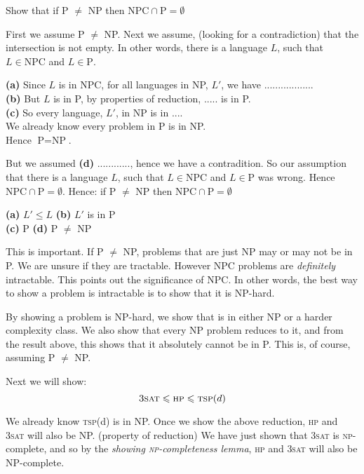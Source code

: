 \begin{example}
Show that if P $\neq$ NP then $\text{NPC} \cap \text{P} = \emptyset$

First we assume P $\neq$ NP. Next we assume, (looking for a contradiction) 
that the intersection is not empty. In other words,
there is a language $L$, such that $L \in \text{NPC}$ and $L \in \text{P}$.

\textbf{(a)} Since $L$ is in NPC, for all languages in NP, $L'$, we have .................. \\
\textbf{(b)} But $L$ is in P, by properties of reduction, ..... is in P. \\
\textbf{(c)} So every language, $L'$, in NP is in .... \\
We already know every problem in P is in NP. \\
Hence $\text{P} = \text{NP}$.

But we assumed \textbf{(d)} ............, hence we have a contradition. 
So our assumption that there is a language $L$, such that $L \in \text{NPC}$ and $L \in \text{P}$ 
was wrong. Hence $\text{NPC} \cap \text{P} = \emptyset$. 
Hence: if P $\neq$ NP then $\text{NPC} \cap \text{P} = \emptyset$ 

\end{example}

{
\textbf{(a)} $L' \leqslant L$  
\textbf{(b)} $L'$ is in P \\
\textbf{(c)} P 
\textbf{(d)} P $\neq$ NP
}



This is important. If P $\neq$ NP, problems that are just NP may or 
may not be in P. We are unsure if they are tractable. However NPC 
problems are \textit{definitely} intractable. This points out the 
signiﬁcance of NPC. In other words, 
the best way to show a problem is intractable 
is to show that it is NP-hard.

By showing a problem is NP-hard, we show that is in either NP or 
a harder complexity class. We also show that
every NP problem reduces to it, and from the result above, 
this shows that it absolutely cannot be in P. 
This is, of course, assuming P $\neq$ NP. 



Next we will show:
$$\textsc{3sat} \leqslant \textsc{hp} \leqslant \textsc{tsp}(d)$$

We already know \textsc{tsp}(d) is in NP.
Once we show the above reduction, \textsc{hp} and \textsc{3sat} will also be NP. (property of reduction)
We have just shown that \textsc{3sat} is \textsc{np}-complete, and so by the
\textit{showing \textsc{np}-completeness lemma}, \textsc{hp} 
and \textsc{3sat} will also be NP-complete.

